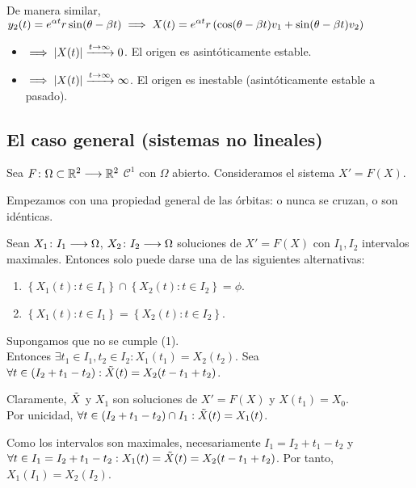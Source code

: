 De manera similar, $\displaystyle y_2(t) = e^{\alpha t} r \sin(\theta - \beta t) \implies X(t) = e^{\alpha t} r \left(\cos(\theta - \beta t) v_1 + \sin(\theta - \beta t) v_2\right)$
\begin{itemize}
	\item {} $\implies \left|X(t)\right| \xrightarrow{t\to\infty} 0$. El origen es asintóticamente estable.
	\item {} $\implies \left|X(t)\right| \xrightarrow{t\to\infty} \infty$. El origen es inestable (asintóticamente estable a pasado).
\end{itemize}


\subsection{El caso general (sistemas no lineales)}

Sea $F \colon \Omega\subset \mathbb{R}^2 \longrightarrow \mathbb{R}^2$ $\mathcal{C}^1$ con $\Omega$ abierto. Consideramos el sistema $\boxed{X'=F(X)}$.

Empezamos con una propiedad general de las órbitas: o nunca se cruzan, o son idénticas.

\begin{prop}
	Sean $X_1 \colon I_1 \longrightarrow \Omega$, $X_2 \colon I_2 \longrightarrow \Omega$ soluciones de $X'=F(X)$ con $I_1, I_2$ intervalos maximales. Entonces solo puede darse una de las siguientes alternativas:
	\begin{enumerate}
		\item $\left\{X_1(t) : t\in I_1\right\} \cap \left\{X_2(t) : t\in I_2\right\} = \phi$.
		\item $\left\{X_1(t) : t\in I_1\right\} = \left\{X_2(t) : t\in I_2\right\}$.
	\end{enumerate}
	\begin{dem}
		Supongamos que no se cumple (1). \\
		Entonces $\exists t_1 \in I_1, t_2 \in I_2 : X_1(t_1) = X_2(t_2)$. Sea $\forall t \in (I_2 +t_1 - t_2) : \tilde{X}(t) = X_2(t-t_1 +t_2)$.

		Claramente, $\Tilde{X}$ y $X_1$ son soluciones de $X'=F(X)$ y $X(t_1) = X_0$. \\
		Por unicidad, $\forall t \in (I_2 + t_1 - t_2) \cap I_1 : \tilde{X}(t) = X_1(t)$.

		Como los intervalos son maximales, necesariamente $I_1 = I_2 + t_1 - t_2$ y \\
		$\forall t \in I_1 = I_2 + t_1 - t_2 : X_1(t) = \tilde{X}(t) = X_2(t - t_1 + t_2)$. Por tanto, $X_1(I_1) = X_2(I_2)$.
	\end{dem}
\end{prop}

